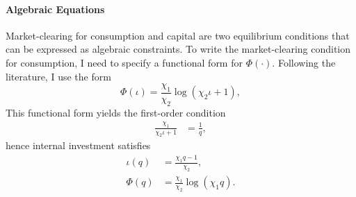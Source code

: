 \documentclass[12 pt, oneside]{article}
\theoremstyle{definition}
\theoremstyle{definition}
\theoremstyle{definition}
\begin{document}
\paragraph{Algebraic Equations}

Market-clearing for consumption and capital are two equilibrium conditions that can be expressed as algebraic constraints.
To write the market-clearing condition for consumption, I need to specify a functional form for $\Phi(\cdot)$. Following the literature, I use the form
\begin{equation}
  \label{eq:Phi functional form}
\Phi(\iota)  = \frac{\chi_1}{\chi_2} \log(\chi_2\iota + 1),
\end{equation}
This functional form yields the first-order condition
\begin{align*}
  \frac{\chi_1}{\chi_2\iota + 1} & = \frac{1}{q},
\end{align*}
hence internal investment satisfies
\begin{align}
  \label{eq:internal investment as function of q}
\iota(q) & = \frac{\chi_1q - 1}{\chi_2}, \\
\label{eq:Phi as function of q}
\Phi(q) & = \frac{\chi_1}{\chi_2}\log(\chi_1 q).
\end{align}
\end{document}
